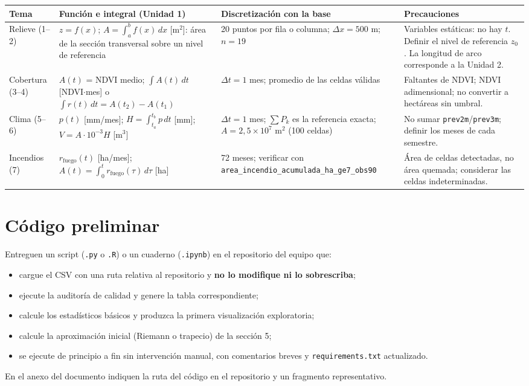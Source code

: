 \documentclass[11pt,a4paper]{article}
\begin{document}
\begin{center}\small
\begin{tabularx}{\linewidth}{L{2.4cm} Y Y Y}
\toprule
\textbf{Tema} & \textbf{Función e integral (Unidad 1)} & \textbf{Discretización con la base} & \textbf{Precauciones}\\
\midrule
Relieve (1--2) & $z=f(x)$; $A=\int_a^b f(x)\,dx$ [m$^2$]: área de la sección transversal sobre un nivel de referencia & 20 puntos por fila o columna; $\Delta x=500$ m; $n=19$ & Variables estáticas: no hay $t$. Definir el nivel de referencia $z_0$. La longitud de arco corresponde a la Unidad 2.\\
Cobertura (3--4) & $A(t)$ = NDVI medio; $\int A(t)\,dt$ [NDVI$\cdot$mes] o $\int r(t)\,dt=A(t_2)-A(t_1)$ & $\Delta t=1$ mes; promedio de las celdas válidas & Faltantes de NDVI; NDVI adimensional; no convertir a hectáreas sin umbral.\\
Clima (5--6) & $p(t)$ [mm/mes]; $H=\int_{t_a}^{t_b}p\,dt$ [mm]; $V=A\cdot10^{-3}H$ [m$^3$] & $\Delta t=1$ mes; $\sum P_k$ es la referencia exacta; $A=2{,}5\times10^{7}$ m$^2$ (100 celdas) & No sumar \texttt{prev2m}/\texttt{prev3m}; definir los meses de cada semestre.\\
Incendios (7) & $r_{\text{fuego}}(t)$ [ha/mes]; $A(t)=\int_0^t r_{\text{fuego}}(\tau)\,d\tau$ [ha] & 72 meses; verificar con \texttt{area\_incendio\_acumulada\_ha\_ge7\_obs90} & Área de celdas detectadas, no área quemada; considerar las celdas indeterminadas.\\
\bottomrule
\end{tabularx}
\end{center}

\section{Código preliminar}
Entreguen un script (\texttt{.py} o \texttt{.R}) o un cuaderno (\texttt{.ipynb}) en el repositorio del equipo que:
\begin{itemize}
  \item cargue el CSV con una ruta relativa al repositorio y \textbf{no lo modifique ni lo sobrescriba};
  \item ejecute la auditoría de calidad y genere la tabla correspondiente;
  \item calcule los estadísticos básicos y produzca la primera visualización exploratoria;
  \item calcule la aproximación inicial (Riemann o trapecio) de la sección 5;
  \item se ejecute de principio a fin sin intervención manual, con comentarios breves y \texttt{requirements.txt} actualizado.
\end{itemize}
En el anexo del documento indiquen la ruta del código en el repositorio y un fragmento representativo.
\end{document}
